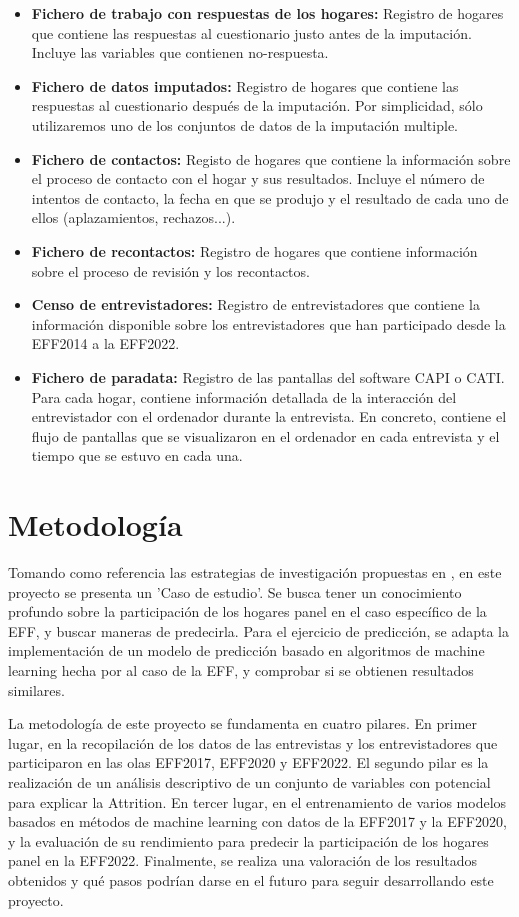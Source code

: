 \begin{itemize}
    \item \textbf{Fichero de trabajo con respuestas de los hogares:} Registro de hogares que contiene las respuestas al cuestionario justo antes de la imputación. Incluye las variables que contienen no-respuesta.
    \item \textbf{Fichero de datos imputados:} Registro de hogares que contiene las respuestas al cuestionario después de la imputación. Por simplicidad, sólo utilizaremos uno de los conjuntos de datos de la imputación multiple.
    \item \textbf{Fichero de contactos:} Registo de hogares que contiene la información sobre el proceso de contacto con el hogar y sus resultados. Incluye el número de intentos de contacto, la fecha en que se produjo y el resultado de cada uno de ellos (aplazamientos, rechazos...).
    \item \textbf{Fichero de recontactos:} Registro de hogares que contiene información sobre el proceso de revisión y los recontactos.
    \item \textbf{Censo de entrevistadores:} Registro de entrevistadores que contiene la información disponible sobre los entrevistadores que han participado desde la EFF2014 a la EFF2022.
    \item \textbf{Fichero de paradata:} Registro de las pantallas del software CAPI o CATI. Para cada hogar, contiene información detallada de la interacción del entrevistador con el ordenador durante la entrevista. En concreto, contiene el flujo de pantallas que se visualizaron en el ordenador en cada entrevista y el tiempo que se estuvo en cada una.
\end{itemize}

\section{Metodología}

Tomando como referencia las estrategias de investigación propuestas en \cite{oates2022researching}, en este proyecto se presenta un 'Caso de estudio'. Se busca tener un conocimiento profundo sobre la participación de los hogares panel en el caso específico de la EFF, y buscar maneras de predecirla. Para el ejercicio de predicción, se adapta la implementación de un modelo de predicción basado en algoritmos de machine learning hecha por \cite{beste2023case} al caso de la EFF, y comprobar si se obtienen resultados similares.

La metodología de este proyecto se fundamenta en cuatro pilares. En primer lugar, en la recopilación de los datos de las entrevistas y los entrevistadores que participaron en las olas EFF2017, EFF2020 y EFF2022. El segundo pilar es la realización de un análisis descriptivo de un conjunto de variables con potencial para explicar la Attrition. En tercer lugar, en el entrenamiento de varios modelos basados en métodos de machine learning con datos de la EFF2017 y la EFF2020, y la evaluación de su rendimiento para predecir la participación de los hogares panel en la EFF2022. Finalmente, se realiza una valoración de los resultados obtenidos y qué pasos podrían darse en el futuro para seguir desarrollando este proyecto.

